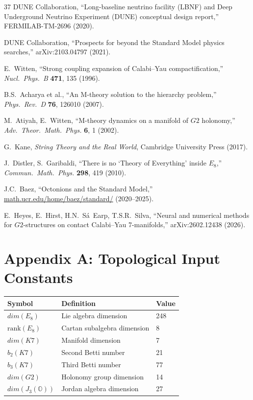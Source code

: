 \documentclass[11pt,a4paper]{article}
\newcommand{\E}{\mathrm{E}}
\newcommand{\Gtwo}{\mathrm{G}_2}
\newcommand{\Kseven}{K_7}
\newcommand{\dimE}{\mathrm{dim}}
\newcommand{\rank}{\mathrm{rank}}
\def\Gtwo{G2}%
\def\Kseven{K7}%
\def\E{E}%
\def\dimE{dim}%
\begin{document}
\begin{thebibliography}{37}
 DUNE Collaboration, ``Long-baseline neutrino facility (LBNF) and Deep Underground Neutrino Experiment (DUNE) conceptual design report,'' FERMILAB-TM-2696 (2020).

 DUNE Collaboration, ``Prospects for beyond the Standard Model physics searches,'' arXiv:2103.04797 (2021).

 E.~Witten, ``Strong coupling expansion of Calabi--Yau compactification,'' \textit{Nucl.\ Phys.\ B} \textbf{471}, 135 (1996).

 B.S.~Acharya et al., ``An M-theory solution to the hierarchy problem,'' \textit{Phys.\ Rev.\ D} \textbf{76}, 126010 (2007).

 M.~Atiyah, E.~Witten, ``M-theory dynamics on a manifold of $\Gtwo$ holonomy,'' \textit{Adv.\ Theor.\ Math.\ Phys.} \textbf{6}, 1 (2002).

 G.~Kane, \textit{String Theory and the Real World}, Cambridge University Press (2017).

 J.~Distler, S.~Garibaldi, ``There is no `Theory of Everything' inside $\E_8$,'' \textit{Commun.\ Math.\ Phys.} \textbf{298}, 419 (2010).

 J.C.~Baez, ``Octonions and the Standard Model,'' \url{math.ucr.edu/home/baez/standard/} (2020--2025).

 E.~Heyes, E.~Hirst, H.N.~S\'a~Earp, T.S.R.~Silva, ``Neural and numerical methods for $\Gtwo$-structures on contact Calabi--Yau 7-manifolds,'' arXiv:2602.12438 (2026).

\end{thebibliography}

\newpage

\section*{Appendix A: Topological Input Constants}

\begin{table}[H]
\centering
\begin{tabular}{lll}
\toprule
Symbol & Definition & Value \\
\midrule
$\dimE(\E_8)$ & Lie algebra dimension & 248 \\
$\rank(\E_8)$ & Cartan subalgebra dimension & 8 \\
$\dimE(\Kseven)$ & Manifold dimension & 7 \\
$b_2(\Kseven)$ & Second Betti number & 21 \\
$b_3(\Kseven)$ & Third Betti number & 77 \\
$\dimE(\Gtwo)$ & Holonomy group dimension & 14 \\
$\dimE(J_3(\mathbb{O}))$ & Jordan algebra dimension & 27 \\
\bottomrule
\end{tabular}
\end{table}
\end{document}
